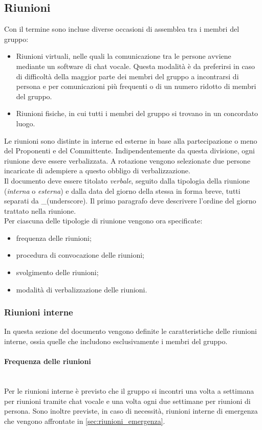 \subsection{Riunioni}
Con il termine  sono incluse diverse occasioni di assemblea tra i membri del gruppo:
\begin{itemize}
\item Riunioni virtuali, nelle quali la comunicazione tra le persone avviene mediante un software di chat vocale. Questa modalità è da preferirsi in caso di difficoltà della maggior parte dei membri del gruppo a incontrarsi di persona e per comunicazioni più frequenti o di un numero ridotto di membri del gruppo.
\item Riunioni fisiche, in cui tutti i membri del gruppo si trovano in un concordato luogo.	
\end{itemize}
Le riunioni sono distinte in interne ed esterne in base alla partecipazione o meno del Proponenti e del Committente. Indipendentemente da questa divisione, ogni riunione deve essere verbalizzata. A rotazione vengono selezionate due persone incaricate di adempiere a questo obbligo di verbalizzazione.\\
Il documento deve essere titolato \textit{verbale}, seguito dalla tipologia della riunione (\textit{interna} o \textit{esterna}) e dalla data del giorno della stessa in forma breve, tutti separati da \_(underscore). Il primo paragrafo deve descrivere l'ordine del giorno trattato nella riunione.\\
Per ciascuna delle tipologie di riunione vengono ora specificate:
\begin{itemize}
	\item frequenza delle riunioni;
	\item procedura di convocazione delle riunioni;
	\item svolgimento delle riunioni;
	\item modalità di verbalizzazione delle riunioni.	 
\end{itemize}

\subsubsection{Riunioni interne}
In questa sezione del documento vengono definite le caratteristiche delle riunioni interne, ossia quelle che includono esclusivamente i membri del gruppo.

\paragraph{Frequenza delle riunioni}\mbox{}\\
Per le riunioni interne è previsto che il gruppo si incontri una volta a settimana per riunioni tramite chat vocale e una volta ogni due settimane per riunioni di persona. Sono inoltre previste, in caso di necessità, riunioni interne di emergenza che vengono affrontate in \sezione \ref{sec:riunioni_emergenza}.


